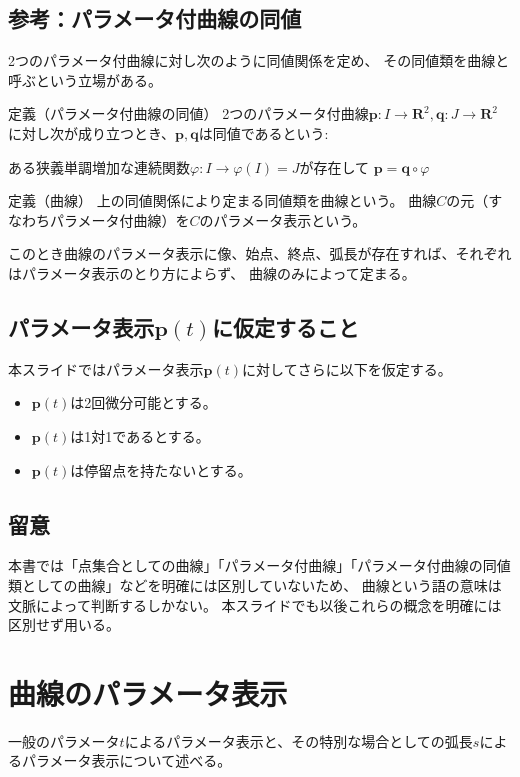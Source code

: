 \documentclass[a4j,disablejfam,dvipdfmx,papersize,slide,uplatex,21pt]{jsarticle}
\begin{document}
\newpage
\subsection*{参考：パラメータ付曲線の同値}
2つのパラメータ付曲線に対し次のように同値関係を定め、
その同値類を曲線と呼ぶという立場がある\cite{kaiseki1}。
\begin{itembox}[l]{定義（パラメータ付曲線の同値）}
    2つのパラメータ付曲線$\bm{p}: I \rightarrow \mathbf{R}^2, \bm{q}: J \rightarrow \mathbf{R}^2$
    に対し次が成り立つとき、$\bm{p}, \bm{q}$は同値であるという:
    \begin{center}
        ある狭義単調増加な連続関数$\varphi: I \rightarrow \varphi(I) = J$が存在して
        $\bm{p} = \bm{q} \circ \varphi$
    \end{center}
\end{itembox}

\begin{itembox}[l]{定義（曲線）}
    上の同値関係により定まる同値類を曲線という。
    曲線$C$の元（すなわちパラメータ付曲線）を$C$のパラメータ表示という。
\end{itembox}

このとき曲線のパラメータ表示に像、始点、終点、弧長が存在すれば、それぞれはパラメータ表示のとり方によらず、
曲線のみによって定まる。


\newpage
\subsection*{パラメータ表示$\bm{p}(t)$に仮定すること}
本スライドではパラメータ表示$\bm{p}(t)$に対してさらに以下を仮定する。
\begin{itemize}
    \item $\bm{p}(t)$は2回微分可能とする。
    \item $\bm{p}(t)$は1対1であるとする。
    \item $\bm{p}(t)$は停留点を持たないとする。
\end{itemize}

\newpage
\subsection*{留意}
本書では「点集合としての曲線」「パラメータ付曲線」「パラメータ付曲線の同値類としての曲線」などを明確には区別していないため、
曲線という語の意味は文脈によって判断するしかない。
本スライドでも以後これらの概念を明確には区別せず用いる。




\section{曲線のパラメータ表示}
一般のパラメータ$t$によるパラメータ表示と、その特別な場合としての弧長$s$によるパラメータ表示について述べる。
\end{document}
